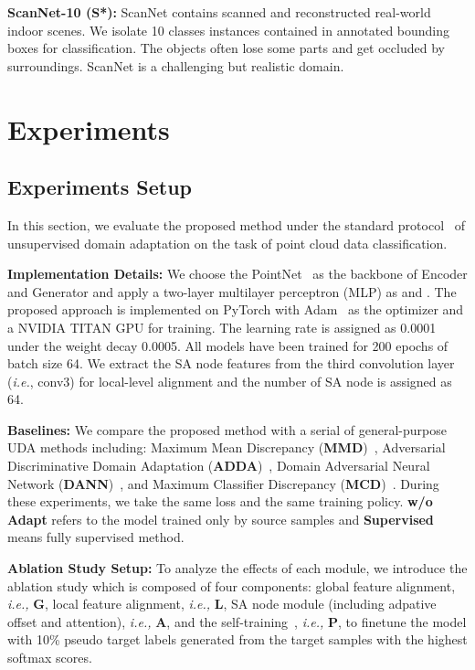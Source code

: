 \documentclass{article}
\newcommand*\ie{\textit{i.e.}}
\begin{document}
\textbf{ScanNet-10 (S*):} ScanNet contains scanned and reconstructed real-world indoor scenes. We isolate 10 classes instances contained in annotated bounding boxes for classification. The objects often lose some parts and get occluded by surroundings. ScanNet is a challenging but realistic domain.






\section{Experiments}

\subsection{Experiments Setup}

In this section, we evaluate the proposed method under the standard protocol~\cite{gong2013connecting} of unsupervised domain adaptation on the task of point cloud data classification.

\textbf{Implementation Details: }We choose the PointNet~\cite{qi2017pointnet} as the backbone of Encoder  and Generator  and apply a two-layer multilayer perceptron (MLP) as  and . The proposed approach is implemented on PyTorch with Adam~\cite{kingma2014adam} as the optimizer and a NVIDIA TITAN GPU for training. The learning rate is assigned as 0.0001 under the weight decay 0.0005. All models have been trained for 200 epochs of batch size 64. We extract the SA node features from the third convolution layer (\ie, conv3) for local-level alignment and the number of SA node is assigned as 64. 

\textbf{Baselines:} We compare the proposed method with a serial of general-purpose UDA methods including: Maximum Mean Discrepancy (\textbf{MMD})~\cite{long2013transfer}, Adversarial Discriminative Domain Adaptation (\textbf{ADDA})~\cite{tzeng2017adversarial}, Domain Adversarial Neural Network (\textbf{DANN})~\cite{ganin2014unsupervised}, and Maximum Classifier Discrepancy (\textbf{MCD})~\cite{saito2018maximum}. During these experiments, we take the same loss and the same training policy. \textbf{w/o Adapt} refers to the model trained only by source samples and \textbf{Supervised} means fully supervised method.

\textbf{Ablation Study Setup: }To analyze the effects of each module, we introduce the ablation study which is composed of four components: global feature alignment, \textit{i.e.,} \textbf{G}, local feature alignment, \textit{i.e.,} \textbf{L}, SA node module (including adpative offset and attention), \textit{i.e.,} \textbf{A}, and the self-training~\cite{zou2018unsupervised}, \textit{i.e.,} \textbf{P}, to finetune the model with 10\% pseudo target labels generated from the target samples with the highest softmax scores. 
\end{document}
